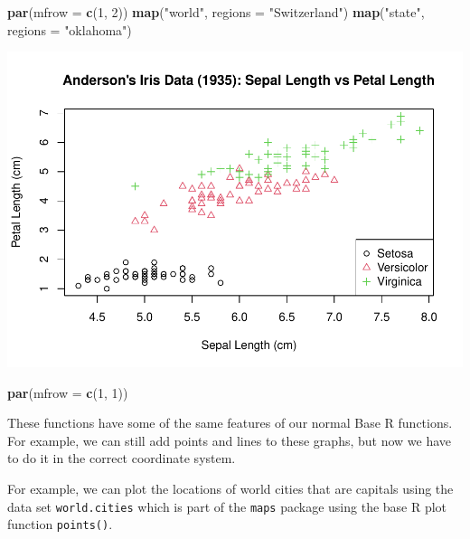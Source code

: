 \documentclass[
]{book}
\newenvironment{Shaded}{\begin{snugshade}}{\end{snugshade}}
\newcommand{\DataTypeTok}[1]{\textcolor[rgb]{0.13,0.29,0.53}{#1}}
\newcommand{\DecValTok}[1]{\textcolor[rgb]{0.00,0.00,0.81}{#1}}
\newcommand{\KeywordTok}[1]{\textcolor[rgb]{0.13,0.29,0.53}{\textbf{#1}}}
\newcommand{\NormalTok}[1]{#1}
\newcommand{\OperatorTok}[1]{\textcolor[rgb]{0.81,0.36,0.00}{\textbf{#1}}}
\newcommand{\StringTok}[1]{\textcolor[rgb]{0.31,0.60,0.02}{#1}}
\begin{document}
\begin{Shaded}
\begin{Highlighting}[]
\KeywordTok{par}\NormalTok{(}\DataTypeTok{mfrow =} \KeywordTok{c}\NormalTok{(}\DecValTok{1}\NormalTok{, }\DecValTok{2}\NormalTok{))}
\KeywordTok{map}\NormalTok{(}\StringTok{"world"}\NormalTok{, }\DataTypeTok{regions =} \StringTok{"Switzerland"}\NormalTok{)}
\KeywordTok{map}\NormalTok{(}\StringTok{"state"}\NormalTok{, }\DataTypeTok{regions =} \StringTok{"oklahoma"}\NormalTok{)}
\end{Highlighting}
\end{Shaded}

\includegraphics{_main_files/figure-latex/unnamed-chunk-193-1.pdf}

\begin{Shaded}
\begin{Highlighting}[]
\KeywordTok{par}\NormalTok{(}\DataTypeTok{mfrow =} \KeywordTok{c}\NormalTok{(}\DecValTok{1}\NormalTok{, }\DecValTok{1}\NormalTok{))}
\end{Highlighting}
\end{Shaded}

These functions have some of the same features of our normal Base R functions. For example, we can still add points and lines to these graphs, but now we have to do it in the correct coordinate system.

For example, we can plot the locations of world cities that are capitals using the data set \texttt{world.cities} which is part of the \texttt{maps} package using the base R plot function \texttt{points()}.

\begin{Shaded}
\end{Shaded}
\end{document}
